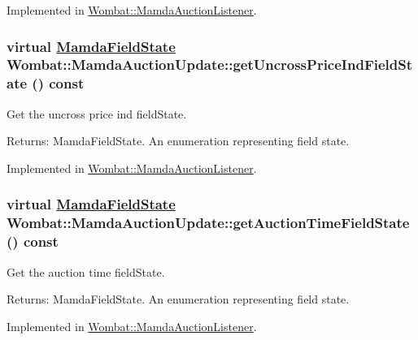 Implemented in \hyperlink{classWombat_1_1MamdaAuctionListener_8c84b078ac2c5e02cbb1dea5810cca7a}{Wombat::Mamda\-Auction\-Listener}.\hypertarget{classWombat_1_1MamdaAuctionUpdate_a7a595ba208a8ad7f1230f727bb8449a}{
\subsubsection[getUncrossPriceIndFieldState]{\setlength{\rightskip}{0pt plus 5cm}virtual \hyperlink{namespaceWombat_93aac974f2ab713554fd12a1fa3b7d2a}{Mamda\-Field\-State} Wombat::Mamda\-Auction\-Update::get\-Uncross\-Price\-Ind\-Field\-State () const}}
\label{classWombat_1_1MamdaAuctionUpdate_a7a595ba208a8ad7f1230f727bb8449a}


Get the uncross price ind field\-State. 

\begin{Desc}
\item[Returns:]Mamda\-Field\-State. An enumeration representing field state. \end{Desc}


Implemented in \hyperlink{classWombat_1_1MamdaAuctionListener_99612e2b16ee7630f35ec21060109b11}{Wombat::Mamda\-Auction\-Listener}.\hypertarget{classWombat_1_1MamdaAuctionUpdate_fffddb01aee5c4584f3a8c574c8746b1}{
\subsubsection[getAuctionTimeFieldState]{\setlength{\rightskip}{0pt plus 5cm}virtual \hyperlink{namespaceWombat_93aac974f2ab713554fd12a1fa3b7d2a}{Mamda\-Field\-State} Wombat::Mamda\-Auction\-Update::get\-Auction\-Time\-Field\-State () const}}
\label{classWombat_1_1MamdaAuctionUpdate_fffddb01aee5c4584f3a8c574c8746b1}


Get the auction time field\-State. 

\begin{Desc}
\item[Returns:]Mamda\-Field\-State. An enumeration representing field state. \end{Desc}


Implemented in \hyperlink{classWombat_1_1MamdaAuctionListener_62f24f47ce07200543881e47e8ff100f}{Wombat::Mamda\-Auction\-Listener}.